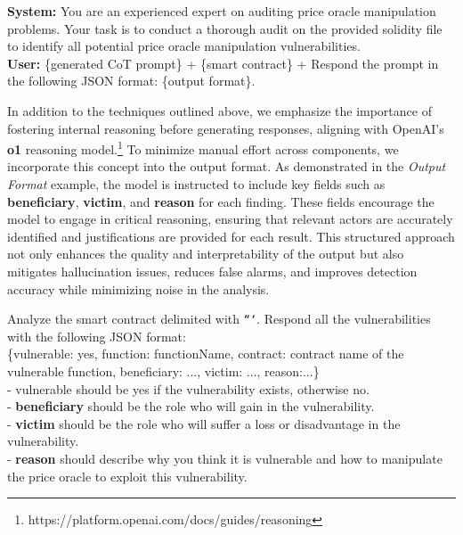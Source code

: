 \begin{tcolorbox}[colback=gray!20, colframe=gray!50, title={Auditor Prompt Example}, label=prompt_auditor]
\textbf{System:} You are an experienced expert on auditing price oracle manipulation problems. Your task is to conduct a thorough audit on the provided solidity file to identify all potential price oracle manipulation vulnerabilities. \\

\textbf{User:} \{generated CoT prompt\} + \{smart contract\} + Respond the prompt in the following JSON format: \{output format\}.
\end{tcolorbox}

In addition to the techniques outlined above, we emphasize the importance of fostering internal reasoning before generating responses, aligning with OpenAI's \textbf{o1} reasoning model.\footnote{https://platform.openai.com/docs/guides/reasoning}
To minimize manual effort across components, we incorporate this concept into the output format.
As demonstrated in the \textit{Output Format} example, the model is instructed to include key fields such as \textbf{beneficiary}, \textbf{victim}, and \textbf{reason} for each finding. These fields encourage the model to engage in critical reasoning, ensuring that relevant actors are accurately identified and justifications are provided for each result.
This structured approach not only enhances the quality and interpretability of the output but also mitigates hallucination issues, reduces false alarms, and improves detection accuracy while minimizing noise in the analysis.

\begin{tcolorbox}[colback=gray!20, colframe=gray!50, title={Output Format Example}, label=outputformat]
    Analyze the smart contract delimited with \texttt{```}. Respond all the vulnerabilities with the following JSON format: \\
    \{vulnerable: yes, function: functionName, contract: contract name of the vulnerable function, beneficiary: ..., victim: ..., reason:...\} \\

    - vulnerable should be yes if the vulnerability exists, otherwise no. \\
    - \textbf{beneficiary} should be the role who will gain in the vulnerability. \\
    - \textbf{victim} should be the role who will suffer a loss or disadvantage in the vulnerability. \\
    - \textbf{reason} should describe why you think it is vulnerable and how to manipulate the price oracle to exploit this vulnerability.
\end{tcolorbox}






